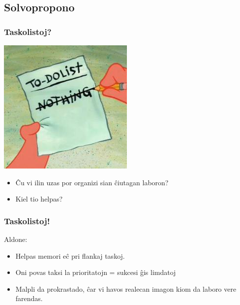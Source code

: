    
\subsection{Solvopropono}
   
  \begin{frame}
    \frametitle{Taskolistoj?}

   	\begin{center}
	   	\includegraphics[scale=0.5]{meme/to_do_list}
   	\end{center}
    
    \begin{itemize}
    	\item Ĉu vi ilin uzas por organizi sian ĉiutagan laboron?
    	\item Kiel tio helpas?
    \end{itemize}
        
  \end{frame}    


   
  \begin{frame}
    \frametitle{Taskolistoj!}
    Aldone:
    \begin{itemize}
    	\item Helpas memori eĉ pri flankaj taskoj.
     	\item Oni povas taksi la prioritatojn = sukcesi ĝis limdatoj
        \item Malpli da prokrastado, ĉar vi havos realecan imagon kiom da laboro vere farendas.      
    \end{itemize}
  \end{frame}      

